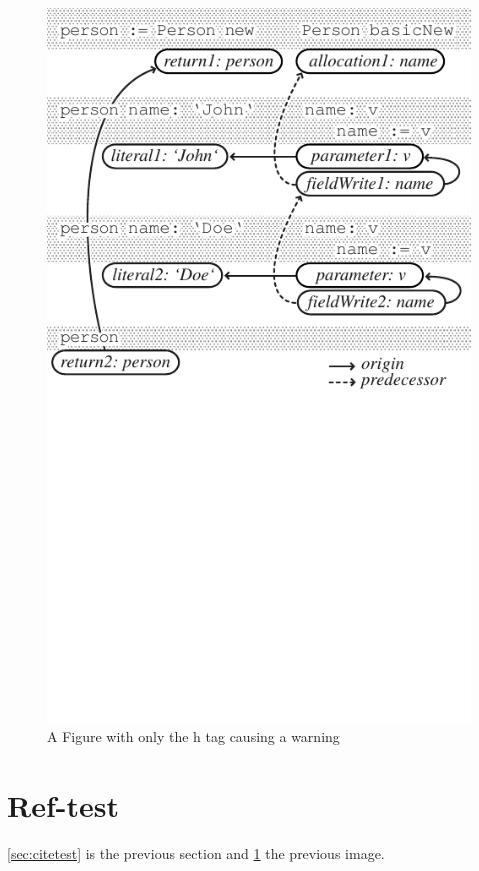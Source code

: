 \documentclass[10pt]{article}
\begin{document}
\begin{figure}[h]
	\centering
	\includegraphics{objectflow.pdf}
	\caption{A Figure with only the h tag causing a warning}
	\label{fig:htWarning}
\end{figure}


\section{Ref-test}
\ref{sec:citetest} is the previous section and \ref{fig:htWarning} the
previous image.





\end{document}
